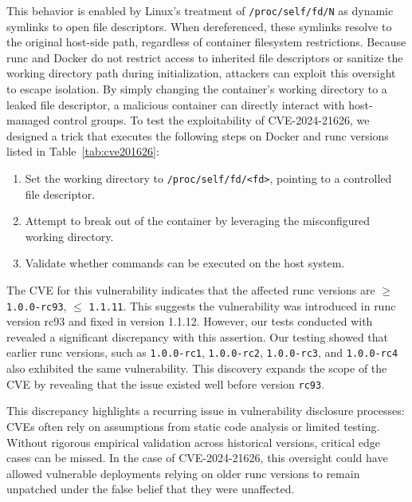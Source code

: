 This behavior is enabled by Linux's treatment of \texttt{/proc/self/fd/N} as dynamic symlinks to open file descriptors. When dereferenced, these symlinks resolve to the original host-side path, regardless of container filesystem restrictions. Because runc and Docker do not restrict access to inherited file descriptors or sanitize the working directory path during initialization, attackers can exploit this oversight to escape isolation. By simply changing the container's working directory to a leaked file descriptor, a malicious container can directly interact with host-managed control groups.
To test the exploitability of CVE-2024-21626, we designed a \houdini trick that executes the following steps on Docker and runc versions listed in Table~\ref{tab:cve201626}:
\begin{enumerate}
    \item Set the working directory to \texttt{/proc/self/fd/<fd>}, pointing to a controlled file descriptor.
    \item Attempt to break out of the container by leveraging the misconfigured working directory.
    \item Validate whether commands can be executed on the host system.
\end{enumerate}

The CVE for this vulnerability indicates that the affected runc versions are $\geq$ \texttt{1.0.0-rc93}, $\leq$ \texttt{1.1.11}. This suggests the vulnerability was introduced in runc version rc93 and fixed in version 1.1.12. However, our tests conducted with \houdini revealed a significant discrepancy with this assertion. Our testing showed that earlier runc versions, such as \texttt{1.0.0-rc1}, \texttt{1.0.0-rc2}, \texttt{1.0.0-rc3}, and \texttt{1.0.0-rc4} also exhibited the same vulnerability. This discovery expands the scope of the CVE by revealing that the issue existed well before version \texttt{rc93}.

This discrepancy highlights a recurring issue in vulnerability disclosure processes: CVEs often rely on assumptions from static code analysis or limited testing. Without rigorous empirical validation across historical versions, critical edge cases can be missed. In the case of CVE-2024-21626, this oversight could have allowed vulnerable deployments relying on older runc versions to remain unpatched under the false belief that they were unaffected.


